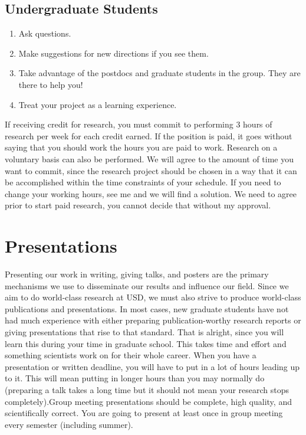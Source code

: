 \documentclass[letterpaper]{article}
\begin{document}
\subsection*{Undergraduate Students}

\begin{enumerate}
\item Ask questions.
\item Make suggestions for new directions if you see them.
\item Take advantage of the postdocs and graduate students in the group. They are there to help you! 
\item Treat your project as a learning experience.
\end{enumerate}

If receiving credit for research, you must commit to performing 3 hours of research per week for each credit earned. If the position is paid, it goes without saying that you should work the hours you are paid to work. Research on a voluntary basis can also be performed. We will agree to the amount of time you want to commit, since the research project should be chosen in a way that it can be accomplished within the time constraints of your schedule. If you need to change your working hours, see me and we will find a solution. We need to agree prior to start paid research, you cannot decide that without my approval.


\section*{Presentations}
Presenting our work in writing, giving talks, and posters are the primary mechanisms we use to disseminate our results and influence our field. Since we aim to do world-class research at USD, we must also strive to produce world-class publications and presentations. In most cases, new graduate students have not had much experience with either preparing publication-worthy research reports or giving presentations that rise to that standard. That is alright, since you will learn this during your time in graduate school. This takes time and effort and something scientists work on for their whole career. When you have a presentation or written deadline, you will have to put in a lot of hours leading up to it. This will mean putting in longer hours than you may normally do (preparing a talk takes a long time but it should not mean your research stops completely).Group meeting presentations should be complete, high quality, and scientifically correct. You are going to present at least once in group meeting every semester (including summer).\\
\end{document}
